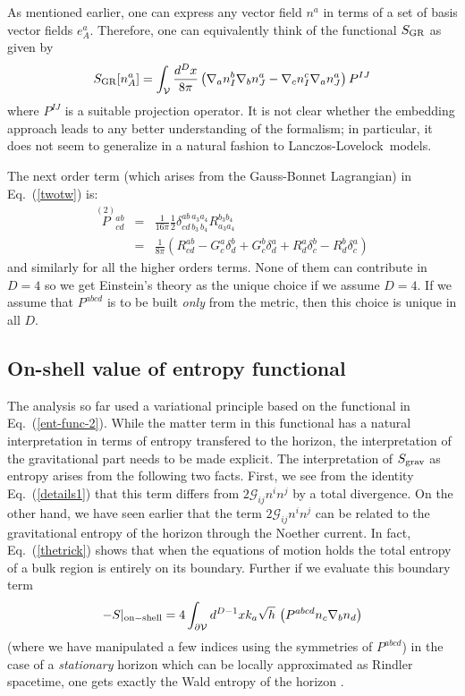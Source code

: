 \documentclass[12pt]{iopart}
\def\eq#1{{Eq.~(\ref{#1})}}
\newcommand{\LL}{Lanczos-Lovelock}
\newcommand{\Cal}[1]{\ensuremath{\mathcal{#1}}}
\newcommand{\D}{\ensuremath{\nabla}}
\newcommand{\dV}{\ensuremath{\partial\Cal{V}}}
\begin{document}
 As mentioned earlier, one can express any vector field $n^a$ in terms of a set of basis vector fields $e^a_A$. Therefore, one can equivalently think of the functional $S_{\rm GR}$ as given by 
 \begin{equation}
S_{\rm GR}[n^a_A]=\int_\Cal{V}\frac{d^Dx}{8\pi}
   \left(\D_an^b_I\D_bn^a_J - \D_cn^c_I\D_an^a_J \right)P^{IJ}
\end{equation}
where $P^{IJ}$ is a suitable projection operator. It is not clear whether the embedding approach leads to any better understanding of the formalism; in particular, it does not seem to generalize in a natural fashion to \LL\ models.

 The next order term (which arises from  the  Gauss-Bonnet Lagrangian) in \eq{twotw} is:
\begin{eqnarray}
\stackrel{(2)}{P}{}^{ab}_{cd}&=& \frac{1}{16\pi}
\frac{1}{2} \delta^{ab\,a_3a_4}_{cd\,b_3\,b_4}
R^{b_3b_4}_{a_3a_4} \nonumber\\
&=&\frac{1}{8\pi} \left(R^{ab}_{cd} -
         G^a_c\delta^b_d+ G^b_c \delta^a_d +  R^a_d \delta^b_c -
         R^b_d \delta^a_c\right) 
\label{pingone}
\end{eqnarray} 
and similarly for all the  higher orders terms. None of them can contribute in $D=4$ so we get Einstein's theory as the unique choice if we assume $D=4$. If we assume that $P^{abcd}$ is to be built \textit{only} from the metric, then this choice is unique in all $D$. 

\subsection{On-shell value of entropy functional}

The analysis so far used a variational principle based on the functional in 
\eq{ent-func-2}.  While the matter term in this functional has a natural interpretation
in terms of entropy transfered to the horizon, the interpretation of the gravitational part needs to be made explicit. The interpretation of $S_{\rm grav}$ as entropy  arises from the following two facts. First, we see from the identity \eq{details1} that this term differs from $2\mathcal{G}_{ij} n^i n^j$ by a total divergence. On the other hand, we have seen earlier that the term $2\mathcal{G}_{ij} n^i n^j$
can be related to the gravitational entropy of the horizon through the Noether current.
In fact, 
 \eq{thetrick} shows that when the equations of motion holds the total entropy of a bulk region is entirely on its boundary. Further
if we evaluate this boundary term
\begin{equation}
-S|_{\rm on-shell}=4\int_{\dV}{d^{D-1}xk_a\sqrt{h}\,\left(P^{abcd}n_c\D_bn_d\right)}
\label{on-shell-2}
\end{equation} 
(where we have manipulated a few indices using the symmetries of
$P^{abcd}$) 
in the case of a \textit{stationary} horizon which can be locally approximated as Rindler spacetime, one gets exactly the Wald entropy of the horizon \cite{aseementropy}.
\end{document}

